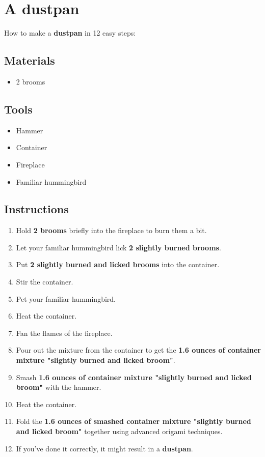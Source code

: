 \documentclass{article}
\begin{document}
\section{A dustpan}How to make a \textbf{dustpan} in 12 easy steps:

\subsection{Materials}\begin{itemize}
\item 
2 brooms
\end{itemize}
\subsection{Tools}\begin{itemize}
\item 
Hammer
\item 
Container
\item 
Fireplace
\item 
Familiar hummingbird
\end{itemize}
\subsection{Instructions}\begin{enumerate}
\item 
Hold \textbf{2 brooms} briefly into the fireplace to burn them a bit.
\item 
Let your familiar hummingbird lick \textbf{2 slightly burned brooms}.
\item 
Put \textbf{2 slightly burned and licked brooms} into the container.
\item 
Stir the container.
\item 
Pet your familiar hummingbird.
\item 
Heat the container.
\item 
Fan the flames of the fireplace.
\item 
Pour out the mixture from the container to get the \textbf{1.6 ounces of container mixture "slightly burned and licked broom"}.
\item 
Smash \textbf{1.6 ounces of container mixture "slightly burned and licked broom"} with the hammer.
\item 
Heat the container.
\item 
Fold the \textbf{1.6 ounces of smashed container mixture "slightly burned and licked broom"} together using advanced origami techniques.
\item 
If you've done it correctly, it might result in a \textbf{dustpan}.
\end{enumerate}
\newpage
\end{document}
